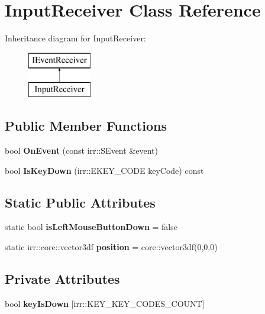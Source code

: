 \hypertarget{class_input_receiver}{}\section{Input\+Receiver Class Reference}
\label{class_input_receiver}
Inheritance diagram for Input\+Receiver\+:\begin{figure}[H]
\begin{center}
\leavevmode
\includegraphics[height=2.000000cm]{class_input_receiver}
\end{center}
\end{figure}
\subsection*{Public Member Functions}
\begin{DoxyCompactItemize}
\item 
\mbox{\label{class_input_receiver_a8cbad01c0e0dcaa953685b1c932d8ce6}} 
bool {\bfseries On\+Event} (const irr\+::\+S\+Event \&event)
\item 
\mbox{\label{class_input_receiver_a736d040738e9826b2abbcc0dd9cd085c}} 
bool {\bfseries Is\+Key\+Down} (irr\+::\+E\+K\+E\+Y\+\_\+\+C\+O\+DE key\+Code) const
\end{DoxyCompactItemize}
\subsection*{Static Public Attributes}
\begin{DoxyCompactItemize}
\item 
\mbox{\label{class_input_receiver_a1763dd9cc9a31639592fb23115cdcc64}} 
static bool {\bfseries is\+Left\+Mouse\+Button\+Down} = false
\item 
\mbox{\label{class_input_receiver_a4bffdbd7b8b83008a8f0d79ab018bb6b}} 
static irr\+::core\+::vector3df {\bfseries position} = core\+::vector3df(0,0,0)
\end{DoxyCompactItemize}
\subsection*{Private Attributes}
\begin{DoxyCompactItemize}
\item 
\mbox{\label{class_input_receiver_a86ce1bb3b52f6bb3499224a508178f10}} 
bool {\bfseries key\+Is\+Down} \mbox{[}irr\+::\+K\+E\+Y\+\_\+\+K\+E\+Y\+\_\+\+C\+O\+D\+E\+S\+\_\+\+C\+O\+U\+NT\mbox{]}
\end{DoxyCompactItemize}


